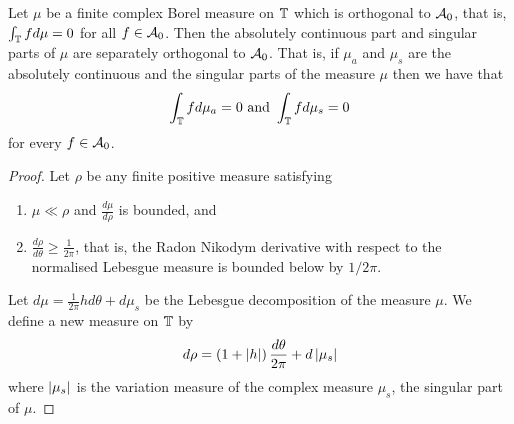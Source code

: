 \begin{corollary}
    Let $\mu$ be a finite complex Borel measure on $\mathbb T$ which is orthogonal to ${\cal A}_{0}$, that is, $\int_{\mathbb T} f d\mu =0$ for all $f\in {\cal A}_{0}$. Then the absolutely continuous part and singular parts of $\mu$ are separately orthogonal to ${\cal A}_{0}$. That is, if $\mu_{a}$ and $\mu_{s}$ are the absolutely continuous and the singular parts of the measure $\mu$ then we have that
    \begin{align*}
	\int_{\mathbb T} f d\mu_{a} = 0 \text{ and } \int_{\mathbb T} f d\mu_{s} = 0
    \end{align*}
    for every $f\in {\cal A}_{0}$. 
\end{corollary}
\begin{proof}
   Let $\rho$ be any finite positive measure satisfying
   \begin{enumerate}
       \item $\mu \ll \rho$ and $\frac{d\mu}{d\rho}$ is bounded, and
       \item $\frac{d\rho}{d\theta} \ge \frac{1}{2\pi}$, that is, the Radon Nikodym derivative with respect to the normalised Lebesgue measure is bounded below by $1/2\pi$.
   \end{enumerate}

   Let $d\mu = \frac{1}{2\pi} h d\theta + d\mu_{s}$ be the Lebesgue decomposition of the measure $\mu$. We define a new measure on $\mathbb T$ by 
   \begin{equation*}
       d\rho =  \left( 1+ \left\lvert h \right\rvert \right) \frac{d\theta}{2\pi} + d\left\lvert \mu_{s} \right\rvert
   \end{equation*}
   where $\left\lvert \mu_{s} \right\rvert$ is the variation measure of the complex measure $\mu_{s}$, the singular part of $\mu$.


\end{proof}
